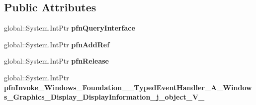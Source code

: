 \subsection*{Public Attributes}
\begin{DoxyCompactItemize}
\item 
\mbox{\label{struct_windows_1_1_foundation_1_1_typed_event_handler___a___windows___graphics___display___displ2d6db8e7cf1fc629bdbfb5ccc4ead7c7_af7e451cdf1d483777eec58caafb9c41f}} 
global\+::\+System.\+Int\+Ptr {\bfseries pfn\+Query\+Interface}
\item 
\mbox{\label{struct_windows_1_1_foundation_1_1_typed_event_handler___a___windows___graphics___display___displ2d6db8e7cf1fc629bdbfb5ccc4ead7c7_a6f2fdfd664170f18f9b13bdd83d9ef99}} 
global\+::\+System.\+Int\+Ptr {\bfseries pfn\+Add\+Ref}
\item 
\mbox{\label{struct_windows_1_1_foundation_1_1_typed_event_handler___a___windows___graphics___display___displ2d6db8e7cf1fc629bdbfb5ccc4ead7c7_a7fd117d9188e263b08db56423ca4ca6b}} 
global\+::\+System.\+Int\+Ptr {\bfseries pfn\+Release}
\item 
\mbox{\label{struct_windows_1_1_foundation_1_1_typed_event_handler___a___windows___graphics___display___displ2d6db8e7cf1fc629bdbfb5ccc4ead7c7_a4b2bc97794e8964204364a7ac76c24a4}} 
global\+::\+System.\+Int\+Ptr {\bfseries pfn\+Invoke\+\_\+\+Windows\+\_\+\+Foundation\+\_\+\+\_\+\+Typed\+Event\+Handler\+\_\+\+A\+\_\+\+Windows\+\_\+\+Graphics\+\_\+\+Display\+\_\+\+Display\+Information\+\_\+j\+\_\+object\+\_\+\+V\+\_\+}
\end{DoxyCompactItemize}
